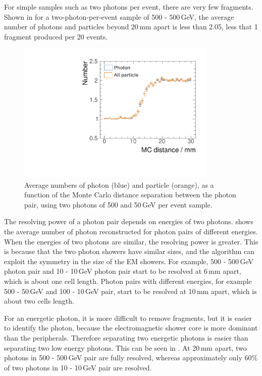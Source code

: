 For simple samples such as two photons per event, there are very few fragments. Shown in  for a two-photon-per-event sample of 500 - 500\,GeV, the average number of photons and particles beyond 20\,mm apart is less than 2.05, less that 1 fragment produced per 20 events.

\begin{figure}[tbph]
\centering
        \includegraphics[width=0.85\textwidth]{photon/DoubleN_pN_all.pdf}
        \caption{Average numbers of photon  (blue) and particle (orange), as a function of the Monte Carlo distance separation between the photon pair, using two photons of 500 and 50\,GeV per event sample. }
        \label{fig:photonDoubleCompareN_pN_all}
\end{figure}

The resolving power of a photon pair depends on energies of two photons.  shows the average number of photon reconstructed for photon pairs of different energies. When the energies of two photons are similar, the resolving power is greater. This is because that the two photon showers have similar sizes, and the \peakFinding algorithm can exploit the symmetry in the size of the EM showers. For example, 500 - 500\,GeV photon pair and 10 - 10\,GeV photon pair start to be resolved at 6\,mm apart, which is about one \ECAL cell length. Photon pairs with different energies, for example 500 - 50\,GeV and  100 - 10\,GeV pair, start to be resolved at 10\,mm apart, which is about two \ECAL cells length.

For an energetic photon, it is more difficult to remove fragments, but it is easier to identify the photon, because the electromagnetic shower core is more dominant than the peripherals. Therefore separating two energetic photons is easier than separating two low energy photons. This can be seen in . At 20\,mm apart, two photons in  500 - 500\,GeV pair are fully resolved, whereas approximately only 60\% of two photons in 10 - 10\,GeV pair are resolved.

